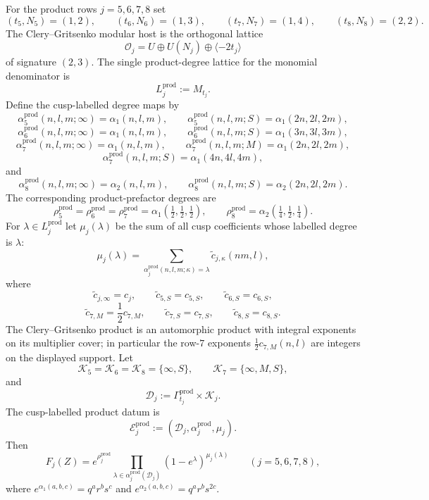 \documentclass[11pt]{memoir}
\begin{document}
\begin{proposition}
\label{prop:congruence-product-degree-lattices}
For the product rows $j=5,6,7,8$ set
$$
(t_5,N_5)=(1,2),\qquad (t_6,N_6)=(1,3),\qquad
(t_7,N_7)=(1,4),\qquad (t_8,N_8)=(2,2).
$$
The Clery--Gritsenko modular host is the orthogonal lattice
$$
\mathcal O_j=U\oplus U(N_j)\oplus\langle-2t_j\rangle
$$
of signature $(2,3)$.  The single product-degree lattice for the
monomial denominator is
$$
L_j^{\mathrm{prod}}:=M_{t_j}.
$$
Define the cusp-labelled degree maps by
$$
\alpha_5^{\mathrm{prod}}(n,l,m;\infty)=\alpha_1(n,l,m),\qquad
\alpha_5^{\mathrm{prod}}(n,l,m;S)=\alpha_1(2n,2l,2m),
$$
$$
\alpha_6^{\mathrm{prod}}(n,l,m;\infty)=\alpha_1(n,l,m),\qquad
\alpha_6^{\mathrm{prod}}(n,l,m;S)=\alpha_1(3n,3l,3m),
$$
$$
\alpha_7^{\mathrm{prod}}(n,l,m;\infty)=\alpha_1(n,l,m),\qquad
\alpha_7^{\mathrm{prod}}(n,l,m;M)=\alpha_1(2n,2l,2m),
$$
$$
\alpha_7^{\mathrm{prod}}(n,l,m;S)=\alpha_1(4n,4l,4m),
$$
and
$$
\alpha_8^{\mathrm{prod}}(n,l,m;\infty)=\alpha_2(n,l,m),\qquad
\alpha_8^{\mathrm{prod}}(n,l,m;S)=\alpha_2(2n,2l,2m).
$$
The corresponding product-prefactor degrees are
$$
\rho_5^{\mathrm{prod}}=\rho_6^{\mathrm{prod}}=\rho_7^{\mathrm{prod}}
=\alpha_1(\tfrac12,\tfrac12,\tfrac12),\qquad
\rho_8^{\mathrm{prod}}=\alpha_2(\tfrac14,\tfrac12,\tfrac14).
$$
For $\lambda\in L_j^{\mathrm{prod}}$ let $\mu_j(\lambda)$ be the sum
of all cusp coefficients whose labelled degree is $\lambda$:
$$
\mu_j(\lambda)=
\sum_{\alpha_j^{\mathrm{prod}}(n,l,m;\kappa)=\lambda}
\widetilde c_{j,\kappa}(nm,l),
$$
where
$$
\widetilde c_{j,\infty}=c_j,\qquad
\widetilde c_{5,S}=c_{5,S},\qquad
\widetilde c_{6,S}=c_{6,S},
$$
$$
\widetilde c_{7,M}=\frac12c_{7,M},\qquad
\widetilde c_{7,S}=c_{7,S},\qquad
\widetilde c_{8,S}=c_{8,S}.
$$
The Clery--Gritsenko product is an automorphic product with integral
exponents on its multiplier cover; in particular the row-$7$ exponents
\(\frac12c_{7,M}(n,l)\) are integers on the displayed support.
Let
$$
\mathcal K_5=\mathcal K_6=\mathcal K_8=\{\infty,S\},\qquad
\mathcal K_7=\{\infty,M,S\},
$$
and
$$
\mathcal D_j:=\Gamma_{t_j}^{\mathrm{prod}}\times\mathcal K_j.
$$
The cusp-labelled product datum is
$$
\mathscr E_j^{\mathrm{prod}}
:=(\mathcal D_j,\alpha_j^{\mathrm{prod}},\mu_j).
$$
Then
$$
F_j(Z)=e^{\rho_j^{\mathrm{prod}}}
\prod_{\lambda\in\alpha_j^{\mathrm{prod}}(\mathcal D_j)}
\left(1-e^\lambda\right)^{\mu_j(\lambda)}
\qquad(j=5,6,7,8),
$$
where $e^{\alpha_1(a,b,c)}=q^ar^bs^c$ and
$e^{\alpha_2(a,b,c)}=q^ar^bs^{2c}$.
\end{proposition}
\end{document}

